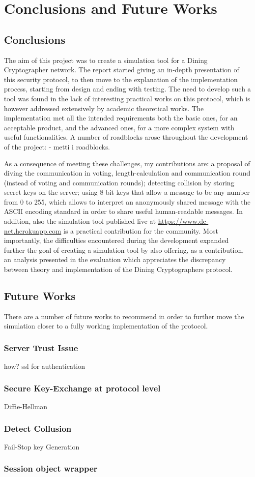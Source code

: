 \chapter{Conclusions and Future Works}

\section{Conclusions}
The aim of this project was to create a simulation tool for a Dining Cryptographer network. The report started giving an in-depth presentation of this security protocol, to then move to the explanation of the implementation process, starting from design and ending with testing. The need to develop such a tool was found in the lack of interesting practical works on this protocol, which is however addressed extensively by academic theoretical works. The implementation met all the intended requirements both the basic ones, for an acceptable product, and the advanced ones, for a more complex system with useful functionalities. A number of roadblocks arose throughout the development of the project: - metti i roadblocks. 

As a consequence of meeting these challenges, my contributions are: a proposal of diving the communication in voting, length-calculation and communication round (instead of voting and communication rounds); detecting collision by storing secret keys on the server; using 8-bit keys that allow a message to be any number from 0 to 255, which allows to interpret an anonymously shared message with the ASCII encoding standard in order to share useful human-readable messages. In addition, also the simulation tool published live at \url{https://www.dc-net.herokuapp.com} is a practical contribution for the community. Most importantly, the difficulties encountered during the development expanded further the goal of creating a simulation tool by also offering, as a contribution, an analysis presented in the evaluation which appreciates the discrepancy between theory and implementation of the Dining Cryptographers protocol.

\section{Future Works}
There are a number of future works to recommend in order to further move the simulation closer to a fully working implementation of the protocol.


\subsection{Server Trust Issue}
how? ssl for authentication

\subsection{Secure Key-Exchange at protocol level}
Diffie-Hellman

\subsection{Detect Collusion}
Fail-Stop key Generation

\subsection{Session object wrapper}